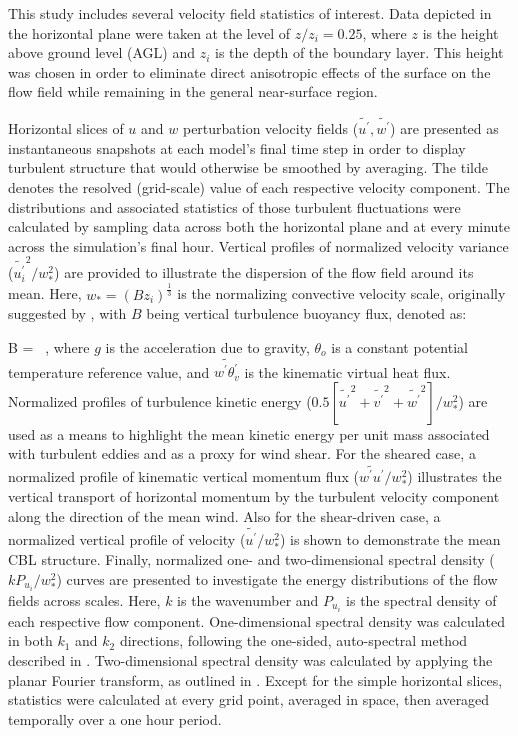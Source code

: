 This study includes several velocity field statistics of interest. Data depicted in the horizontal plane were taken at the level of $z / z_i = 0.25$, where $z$ is the height above ground level (AGL) and $z_i$ is the depth of the boundary layer. This height was chosen in order to eliminate direct anisotropic effects of the surface on the flow field while remaining in the general near-surface region. 

Horizontal slices of $u$ and $w$ perturbation velocity fields ($\widetilde{u^{\prime}}, \widetilde{w^{\prime}}$) are presented as instantaneous snapshots at each model's final time step in order to display turbulent structure that would otherwise be smoothed by averaging. The tilde denotes the resolved (grid-scale) value of each respective velocity component. The distributions and associated statistics of those turbulent fluctuations were calculated by sampling data across both the horizontal plane and at every minute across the simulation's final hour. Vertical profiles of normalized velocity variance ($ \widetilde{u_i^{\prime}}^2  / w_*^2$) are provided to illustrate the dispersion of the flow field around its mean. Here, $w_*= (Bz_i)^{\frac{1}{3}}$ is the normalizing convective velocity scale, originally suggested by  \citet{Deardorff1970}, with $B$ being vertical turbulence buoyancy flux, denoted as:

\be
B =   \mbox{ ,}
\ee
\noindent
where $g$ is the acceleration due to gravity, $\theta_o$ is a constant potential temperature reference value, and $\widetilde{w^{\prime}\theta_v^{\prime}}$ is the kinematic virtual heat flux. Normalized profiles of turbulence kinetic energy ($0.5[\widetilde{u^{\prime}}^2 + \widetilde{v^{\prime}}^2 + \widetilde{w^{\prime}}^2] / w_*^2$) are used as a means to highlight the mean kinetic energy per unit mass associated with turbulent eddies and as a proxy for wind shear. For the sheared case, a normalized profile of kinematic vertical momentum flux ($ \widetilde{w^{\prime}u^{\prime}} / w_*^2$) illustrates the vertical transport of horizontal momentum by the turbulent velocity component along the direction of the mean wind. Also for the shear-driven case, a normalized vertical profile of velocity ($\widetilde{u^{\prime}} / w_*^2$) is shown to demonstrate the mean CBL structure. Finally, normalized one- and two-dimensional spectral density ($kP_{u_i} / w_*^2$) curves are presented to investigate the energy distributions of the flow fields across scales. Here, $k$ is the wavenumber and $P_{u_i}$ is the spectral density of each respective flow component. One-dimensional spectral density was calculated in both $k_1$ and $k_2$ directions, following the one-sided, auto-spectral method described in  \citet{KaiserFeddy}. Two-dimensional spectral density was calculated by applying the planar Fourier transform, as outlined in  \citet{KellyWyngaard2006}. Except for the simple horizontal slices, statistics were calculated at every grid point, averaged in space, then averaged temporally over a one hour period.

